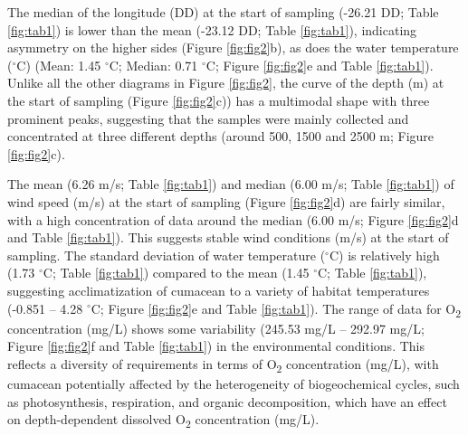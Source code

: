 The median of the longitude (DD) at the start of sampling (-26.21 DD; Table \ref{fig:tab1}) is lower than the mean (-23.12 DD; Table \ref{fig:tab1}), indicating asymmetry on the higher sides (Figure \ref{fig:fig2}b), as does the water temperature ($^\circ$C) (Mean: 1.45 $^\circ$C; Median: 0.71 $^\circ$C; Figure \ref{fig:fig2}e and Table \ref{fig:tab1}). Unlike all the other diagrams in Figure \ref{fig:fig2}, the curve of the depth (m) at the start of sampling (Figure \ref{fig:fig2}c)) has a multimodal shape with three prominent peaks, suggesting that the samples were mainly collected and concentrated at three different depths (around 500, 1500 and 2500 m; Figure \ref{fig:fig2}c).

The mean (6.26 m/s; Table \ref{fig:tab1}) and median (6.00 m/s; Table \ref{fig:tab1}) of wind speed (m/s) at the start of sampling (Figure \ref{fig:fig2}d) are fairly similar, with a high concentration of data around the median (6.00 m/s; Figure \ref{fig:fig2}d and Table \ref{fig:tab1}). This suggests stable wind conditions (m/s) at the start of sampling. The standard deviation of water temperature ($^\circ$C) is relatively high (1.73 $^\circ$C; Table \ref{fig:tab1}) compared to the mean (1.45 $^\circ$C; Table \ref{fig:tab1}), suggesting acclimatization of cumacean to a variety of habitat temperatures (-0.851 – 4.28 $^\circ$C; Figure \ref{fig:fig2}e and Table \ref{fig:tab1}). The range of data for O\textsubscript{2} concentration (mg/L) shows some variability (245.53 mg/L – 292.97 mg/L; Figure \ref{fig:fig2}f and Table \ref{fig:tab1}) in the environmental conditions. This reflects a diversity of requirements in terms of O\textsubscript{2} concentration (mg/L), with cumacean potentially affected by the heterogeneity of biogeochemical cycles, such as photosynthesis, respiration, and organic decomposition, which have an effect on depth-dependent dissolved O\textsubscript{2} concentration (mg/L).

